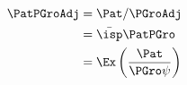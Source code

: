   \begin{align}
    \PatPGroAdj  & = \Pat/\PGroAdj \label{eq;GPF}
    \\ & = \bar{\isp}\PatPGro  \notag %
    \\ & = \Ex\left(\frac{\Pat}{\PGro \psi}\right) \notag
  \end{align}

